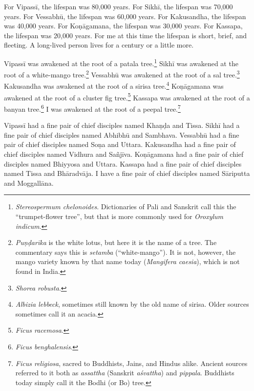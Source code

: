 \documentclass[12pt,openany]{book}%
\begin{document}
For \textsanskrit{Vipassī}, the lifespan was 80,000 years. For \textsanskrit{Sikhī}, the lifespan was 70,000 years. For \textsanskrit{Vessabhū}, the lifespan was 60,000 years. For Kakusandha, the lifespan was 40,000 years. For \textsanskrit{Koṇāgamana}, the lifespan was 30,000 years. For Kassapa, the lifespan was 20,000 years. For me at this time the lifespan is short, brief, and fleeting. A long-lived person lives for a century or a little more. 

\textsanskrit{Vipassī} was awakened at the root of a patala tree.\footnote{\emph{Stereospermum chelonoides}. Dictionaries of Pali and Sanskrit call this the “trumpet-flower tree”, but that is more commonly used for \emph{Oroxylum indicum}. } \textsanskrit{Sikhī} was awakened at the root of a white-mango tree.\footnote{\textit{\textsanskrit{Puṇḍarīka}} is the white lotus, but here it is the name of a tree. The commentary says this is \textit{setamba} (“white-mango”). It is not, however, the mango variety known by that name today (\emph{Mangifera caesia}), which is not found in India. } \textsanskrit{Vessabhū} was awakened at the root of a sal tree.\footnote{\emph{Shorea robusta}. } Kakusandha was awakened at the root of a sirisa tree.\footnote{\emph{Albizia lebbeck}, sometimes still known by the old name of sirisa. Older sources sometimes call it an acacia. } \textsanskrit{Koṇāgamana} was awakened at the root of a cluster fig tree.\footnote{\emph{Ficus racemosa}. } Kassapa was awakened at the root of a banyan tree.\footnote{\emph{Ficus benghalensis}. } I was awakened at the root of a peepal tree.\footnote{\emph{Ficus religiosa}, sacred to Buddhists, Jains, and Hindus alike. Ancient sources referred to it both as \textit{assattha} (Sanskrit \textit{\textsanskrit{aśvattha}}) and \textit{pippala}. Buddhists today simply call it the Bodhi (or Bo) tree. } 

\textsanskrit{Vipassī} had a fine pair of chief disciples named \textsanskrit{Khaṇḍa} and Tissa. \textsanskrit{Sikhī} had a fine pair of chief disciples named \textsanskrit{Abhibhū} and Sambhava. \textsanskrit{Vessabhū} had a fine pair of chief disciples named \textsanskrit{Soṇa} and Uttara. Kakusandha had a fine pair of chief disciples named Vidhura and \textsanskrit{Sañjīva}. \textsanskrit{Koṇāgamana} had a fine pair of chief disciples named Bhiyyosa and Uttara. Kassapa had a fine pair of chief disciples named Tissa and \textsanskrit{Bhāradvāja}. I have a fine pair of chief disciples named \textsanskrit{Sāriputta} and \textsanskrit{Moggallāna}. 
\end{document}
